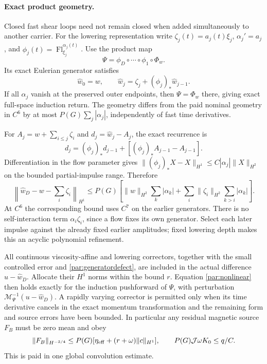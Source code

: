 \documentclass[11pt,a4paper]{amsart}
\theoremstyle{definition}
\theoremstyle{remark}
\numberwithin{equation}{section}
\begin{document}
\paragraph{Exact product geometry.}
Closed fast shear loops need not remain closed when added simultaneously to
another carrier. For the lowering representation write
$\zeta_j(t)=a_j(t)\xi_j$,
$\alpha_j'=a_j$, and $\phi_j(t)=\operatorname{Fl}_{\xi_j}^{\alpha_j(t)}$.
Use the product map
\begin{equation}\label{par:productmap}
 \Psi=\phi_D\circ\cdots\circ\phi_1\circ\Phi_w.
\end{equation}
Its exact Eulerian generator satisfies
\begin{equation}\label{par:generatorrecurrence}
 \widehat w_0=w,\qquad
 \widehat w_j=\zeta_j+(\phi_j)_*\widehat w_{j-1}.
\end{equation}
If all $\alpha_j$ vanish at the preserved outer endpoints, then
$\Psi=\Phi_w$ there, giving exact full-space induction return.
The geometry differs from the paid nominal geometry in $C^6$ by at most
$P(G)\sum_j|\alpha_j|$, independently of fast time derivatives.

For $A_j=w+\sum_{i\le j}\zeta_i$ and
$d_j=\widehat w_j-A_j$, the exact recurrence is
\[
 d_j=(\phi_j)_*d_{j-1}+[(\phi_j)_*A_{j-1}-A_{j-1}].
\]
Differentiation in the flow parameter gives
$\| (\phi_j)_*X-X\|_{H^1}\le C|\alpha_j|\|X\|_{H^2}$ on the bounded
partial-impulse range. Therefore
\begin{equation}\label{par:generatordefect}
 \left\|\widehat w_D-w-\sum_i\zeta_i\right\|_{H^1}
 \le P(G)\left[\|w\|_{H^2}\sum_k|\alpha_k|
 +\sum_i\|\zeta_i\|_{H^2}\sum_{k>i}|\alpha_k|\right].
\end{equation}
At $C^6$ the corresponding bound uses $C^7$ on the earlier generators.
There is no self-interaction term $\alpha_i\zeta_i$, since a flow fixes
its own generator. Select each later impulse against the already fixed
earlier amplitudes; fixed lowering depth makes this an acyclic polynomial
refinement.

All continuous viscosity-affine and lowering correctors, together with the
small controlled error and \eqref{par:generatordefect}, are included in the
actual difference $u-\widehat w_D$. Allocate their $H^1$ norms within the
bound $r$. Equation \eqref{par:nonlinear} then holds exactly for the induction
pushforward of $\Psi$, with perturbation
$\mathcal M_\Psi^{-1}(u-\widehat w_D)$. A rapidly varying corrector is
permitted only when its time derivative cancels in the exact momentum
transformation and the remaining form and source errors have been bounded.
In particular any residual magnetic source $F_B$ must be zero mean and obey
\begin{equation}\label{par:loweringsource}
 \|F_B\|_{H^{-3/4}}
 \le P(G)[\eta_{\rm eff}+(r+\omega)\|c\|_{H^1}],
 \qquad P(G)\mathcal J\omega K_0\le q/C.
\end{equation}
This is paid in one global convolution estimate.
\end{document}
